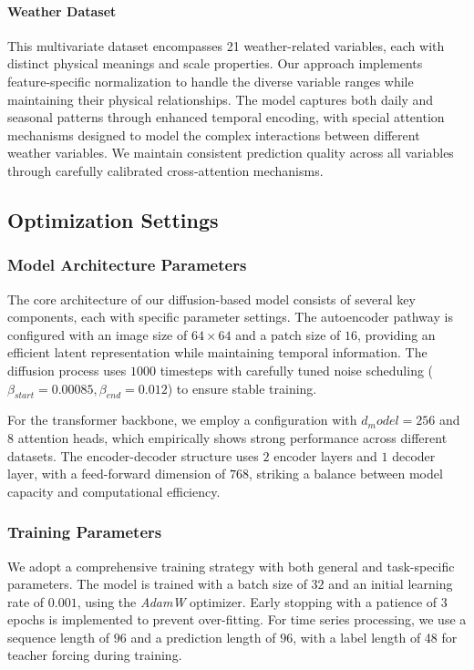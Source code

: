 \paragraph{Weather Dataset~\cite{wu2021autoformer}} This multivariate dataset encompasses 21 weather-related variables, each with distinct physical meanings and scale properties. Our approach implements feature-specific normalization to handle the diverse variable ranges while maintaining their physical relationships. The model captures both daily and seasonal patterns through enhanced temporal encoding, with special attention mechanisms designed to model the complex interactions between different weather variables. We maintain consistent prediction quality across all variables through carefully calibrated cross-attention mechanisms.


\subsection{Optimization Settings}
\label{appx:optimization_settings}

\subsubsection{Model Architecture Parameters}
\label{appx:model_parameters}

The core architecture of our diffusion-based model consists of several key components, each with specific parameter settings. The autoencoder pathway is configured with an image size of $64\times64$ and a patch size of $16$, providing an efficient latent representation while maintaining temporal information. The diffusion process uses $1000$ timesteps with carefully tuned noise scheduling ($\beta_{start} = 0.00085, \beta_{end} = 0.012$) to ensure stable training.

For the transformer backbone, we employ a configuration with $d_model = 256$ and $8$ attention heads, which empirically shows strong performance across different datasets. The encoder-decoder structure uses $2$ encoder layers and $1$ decoder layer, with a feed-forward dimension of $768$, striking a balance between model capacity and computational efficiency.

\subsubsection{Training Parameters}
\label{appx:training_settings}

We adopt a comprehensive training strategy with both general and task-specific parameters. The model is trained with a batch size of $32$ and an initial learning rate of $0.001$, using the \textit{AdamW} optimizer. Early stopping with a patience of $3$ epochs is implemented to prevent over-fitting. For time series processing, we use a sequence length of $96$ and a prediction length of $96$, with a label length of 48 for teacher forcing during training.


